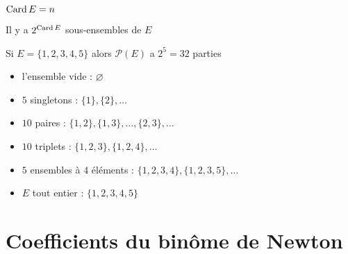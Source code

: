 \begin{frame}

$\mathop{\text{Card}}\nolimits E = n$
\begin{proposition}
Il y a $2^{\mathop{\text{Card}}\nolimits E}$ sous-ensembles de $E$ 
\pause
{}
\end{proposition}

\pause

\begin{exemple}
Si $E= \{1,2,3,4,5\}$ alors $\mathcal{P}(E)$ a $2^5 = 32$ parties

\pause

\begin{itemize}
  \item l'ensemble vide : $\varnothing$
\pause
  \item $5$ singletons : $\{1\}, \{2\},\ldots$
\pause
  \item $10$ paires : $\{1,2\}, \{1,3\}, \ldots, \{2,3\}, \ldots$
\pause
  \item $10$ triplets : $\{1,2,3\},\{1,2,4\},\ldots$
\pause
  \item $5$ ensembles à $4$ éléments : $\{1,2,3,4\}, \{1,2,3,5\},\ldots$
\pause
  \item $E$ tout entier :  $\{1,2,3,4,5\}$
\end{itemize}

\end{exemple}

\end{frame}



\section{Coefficients du binôme de Newton}

